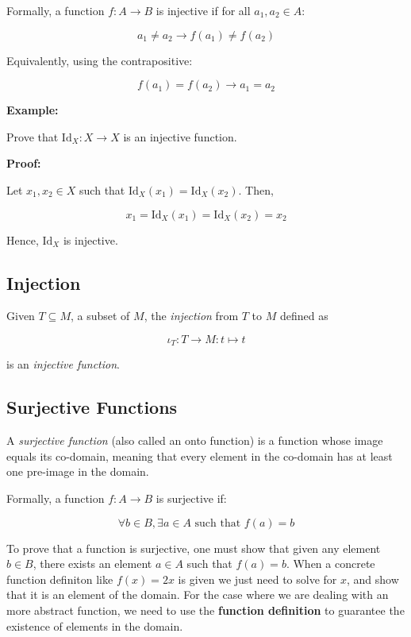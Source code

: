 Formally, a function \(f: A \to B\) is injective if for all \(a_1, a_2 \in A\):

\[
	a_1 \neq a_2 \to f(a_1) \neq f(a_2)
\]

Equivalently, using the contrapositive:

\[
	f(a_1) = f(a_2) \to a_1 = a_2
\]

\textbf{Example:}

Prove that \(\mathrm{Id}_X: X \to X\) is an injective function.

\textbf{Proof:}

Let \(x_1, x_2 \in X\) such that \(\mathrm{Id}_X(x_1) = \mathrm{Id}_X(x_2)\). Then,

\[
	x_1 = \mathrm{Id}_X(x_1) = \mathrm{Id}_X(x_2) = x_2
\]

Hence, \(\mathrm{Id}_X\) is injective.

\QED

\subsection{Injection}

Given \(T \subseteq M\), a subset of \(M\), the \emph{injection} from \(T\) to \(M\) defined as 

\[
	\iota_{T}: T \to M : t \mapsto t
\]

is an \emph{injective function}.

\subsection{Surjective Functions}

A \emph{surjective function} (also called an onto function) is a function whose image equals its co-domain, 
meaning that every element in the co-domain has at least one pre-image in the domain.

Formally, a function \(f: A \to B\) is surjective if:

\[
	\forall b \in B, \exists a \in A \text{ such that } f(a) = b
\]

To prove that a function is surjective, one must show that given any element \(b \in B\), there exists an element \(a \in A\) such that \(f(a) = b\). When 
a concrete function definiton like \(f(x) = 2x\) is given we just need to solve for \(x\), and show that it is an element of the domain. For the case 
where we are dealing with an more abstract function, we need to use the \textbf{function definition} to guarantee the existence of elements in the domain.

